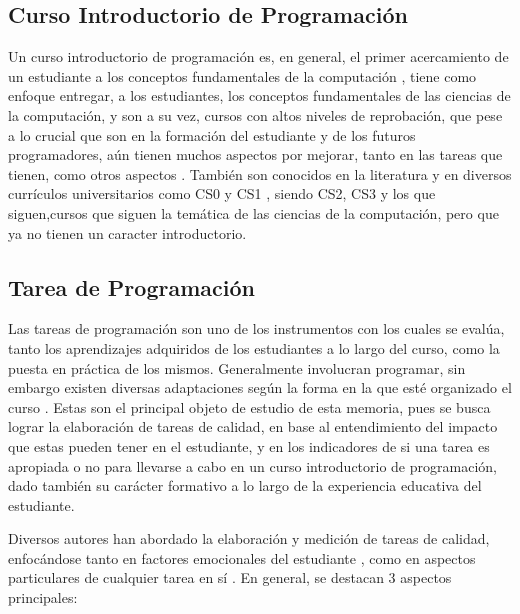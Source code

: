 \documentclass[letterpaper,12pt]{article}
\begin{document}
\subsection{Curso Introductorio de Programación}

Un curso introductorio de programación es, en general, el primer acercamiento de un estudiante a los conceptos fundamentales de la computación \cite{10.7717/peerj-cs.647}, tiene como enfoque entregar, a los estudiantes, los conceptos fundamentales de las ciencias de la computación, y son a su vez, cursos con altos niveles de reprobación, que pese a lo crucial que son en la formación del estudiante y de los futuros programadores, aún tienen muchos aspectos por mejorar, tanto en las tareas que tienen, como otros aspectos \cite{10.1145/2591708.2591749}. También son conocidos en la literatura y en diversos currículos universitarios como CS0 \cite{cs0} y CS1 \cite{cs1}, siendo CS2, CS3 y los que siguen,cursos que siguen la temática de las ciencias de la computación, pero que ya no tienen un caracter introductorio.

\subsection{Tarea de Programación}

Las tareas de programación son uno de los instrumentos con los cuales se evalúa, tanto los aprendizajes adquiridos de los estudiantes a lo largo del curso, como la puesta en práctica de los mismos. Generalmente involucran programar, sin embargo existen diversas adaptaciones según la forma en la que esté organizado el curso \cite{cs1}. Estas son el principal objeto de estudio de esta memoria, pues se busca lograr la elaboración de tareas de calidad, en base al entendimiento del impacto que estas pueden tener en el estudiante, y en los indicadores de si una tarea es apropiada o no para llevarse a cabo en un curso introductorio de programación, dado también su carácter formativo a lo largo de la experiencia educativa del estudiante.

Diversos autores han abordado la elaboración y medición de tareas de calidad, enfocándose tanto en factores emocionales del estudiante \cite{10.1145/1839594.1839609, 10.1145/1227504.1227466, 10.5555/1968521.1968545, 10.1145/2526968.2526982}, como en aspectos particulares de cualquier tarea en sí \cite{texasU, 10.1145/2676723.2677276, 10.1145/1140124.1140167}. En general, se destacan 3 aspectos principales:
\end{document}
